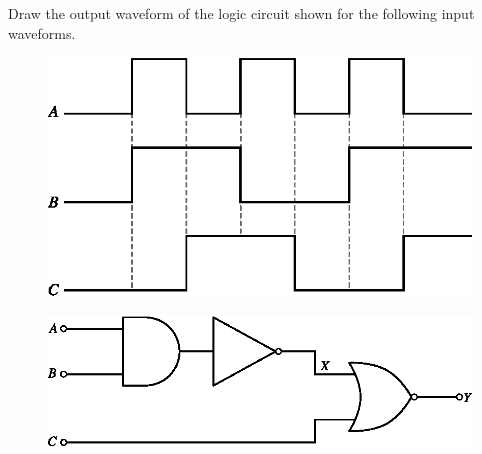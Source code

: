 \medskip
\begin{example}\label{exam6.34}
Draw the output waveform of the logic circuit shown for the following input waveforms.
\begin{figure}[H]
\centering
\includegraphics{chap6/fig123.eps}
\end{figure}
\begin{figure}[H]
\includegraphics{chap6/fig124.eps}
\end{figure}
\end{example}

